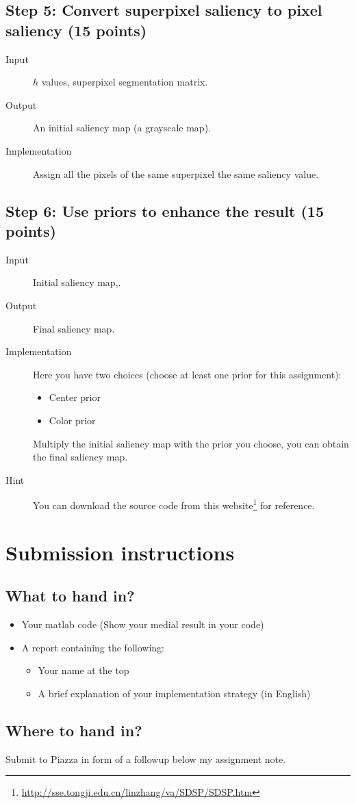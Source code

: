 \documentclass[12pt]{article}
\begin{document}
\subsection{Step 5: Convert superpixel saliency to pixel saliency (15 points)}

\begin{description}
\item[Input] $h$ values, superpixel segmentation matrix.
\item[Output] An initial saliency map (a grayscale map).
\item[Implementation] Assign all the pixels of the same superpixel the same saliency value. 
\end{description}

\subsection{Step 6: Use priors to enhance the result (15 points)}

\begin{description}
\item[Input] Initial saliency map,.
\item[Output] Final saliency map.
\item[Implementation] Here you have two choices (choose at least one prior for this assignment):
\begin{itemize}
\item Center prior
\item Color prior
\end{itemize}
Multiply the initial saliency map with the prior you choose, you can obtain the final saliency map.
\item[Hint] You can download the source code from this website\footnote{\url{http://sse.tongji.edu.cn/linzhang/va/SDSP/SDSP.htm}} for reference.
\end{description}

\section{Submission instructions}

\subsection{What to hand in?}

\begin{itemize}
\item Your matlab code (Show your medial result in your code)
\item A report containing the following:
\begin{itemize}
\item Your name at the top
\item A brief explanation of your implementation strategy (in English)
\end{itemize}
\end{itemize}

\subsection{Where to hand in?}

Submit to Piazza in form of a followup below my assignment note.





%
%
% 

\end{document}
